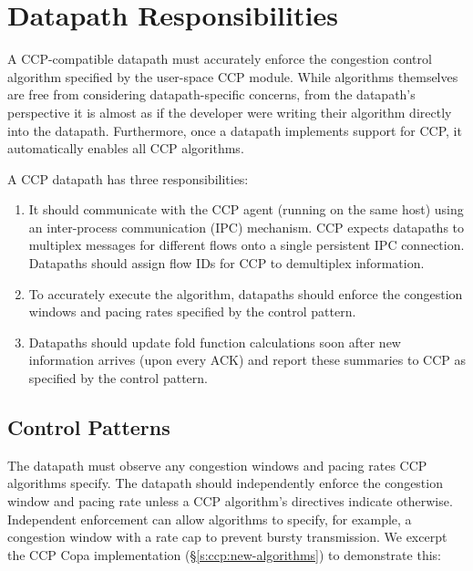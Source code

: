 \section{Datapath Responsibilities}
\label{s:datapath}


A CCP-compatible datapath must accurately enforce the congestion control algorithm specified by the user-space CCP module. While algorithms themselves are free from considering datapath-specific concerns, from the datapath's perspective it is almost as if the developer were writing their algorithm directly into the datapath.
Furthermore, once a datapath implements support for CCP, it automatically enables all CCP algorithms.

\medskip
A CCP datapath has three responsibilities:
\begin{enumerate}
  \item It should communicate with the CCP agent (running on the same host) using an inter-process communication (IPC) mechanism. CCP expects datapaths to multiplex messages for different flows onto a single persistent IPC connection. Datapaths should assign flow IDs for CCP to demultiplex information.
  \item To accurately execute the algorithm, datapaths should enforce the congestion windows and pacing rates specified by the control pattern.
  \item Datapaths should update fold function calculations soon after new information arrives (\ie upon every ACK) and report these summaries to CCP as specified by the control pattern.
\end{enumerate}

\subsection{Control Patterns}
\label{s:datapath:windows}
The datapath must observe any congestion windows and pacing rates CCP algorithms specify. 
The datapath should independently enforce the congestion window and pacing rate unless a CCP algorithm’s directives indicate otherwise. 
Independent enforcement can allow algorithms to specify, for example, a congestion window with a rate cap to prevent bursty transmission. We excerpt the CCP Copa implementation (\S\ref{s:ccp:new-algorithms}) to demonstrate this:


